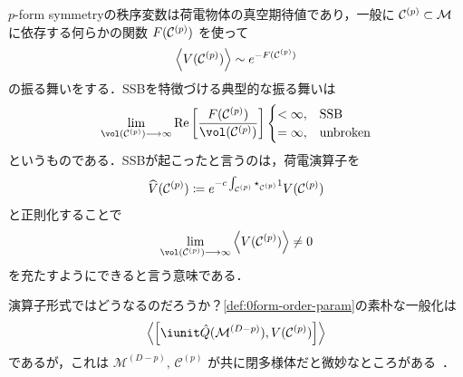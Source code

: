 \documentclass[TQFT_main]{subfiles}
\begin{document}
$p$-form symmetryの秩序変数は荷電物体の真空期待値であり，一般に $\mathcal{C}^{(p)} \subset \mathcal{M}$ に依存する何らかの関数 $F(\mathcal{C}^{(p)})$ を使って
\begin{align}
    \label{def:pform-order-param}
    \expval{V(\mathcal{C}^{(p)})} \sim e^{-F(\mathcal{C}^{(p)})}
\end{align}
の振る舞いをする．SSBを特徴づける典型的な振る舞いは
\begin{align}
    \lim_{\vol (\mfdcal{C}{p}) \lto \infty} \Re \left[ \frac{F(\mfdcal{C}{p})}{\vol (\mfdcal{C}{p})} \right] 
    \begin{cases}
        < \infty, &\text{SSB} \\
        = \infty, &\text{unbroken}
    \end{cases}
\end{align}
というものである．SSBが起こったと言うのは，荷電演算子を
\begin{align}
    \widehat{V}(\mathcal{C}^{(p)}) \coloneqq e^{- c \int_{\mathcal{C}^{(p)}} \star_{\mathcal{C}^{(p)}} 1} V(\mathcal{C}^{(p)})
\end{align}
と正則化することで
\begin{align}
    \lim_{\vol (\mfdcal{C}{p}) \lto \infty} \expval{V(\mfdcal{C}{p})} \neq 0
\end{align}
を充たすようにできると言う意味である．


演算子形式ではどうなるのだろうか？\eqref{def:0form-order-param}の素朴な一般化は
\begin{align}
    \expval{\comm{\iunit \hat{Q}(\mathcal{M}^{(D-p)})}{V(\mathcal{C}^{(p)})}}
\end{align}
であるが，これは $\mathcal{M}^{(D-p)},\, \mathcal{C}^{(p)}$ が共に閉多様体だと微妙なところがある~\cite{Lake2018SSB}．
\end{document}
